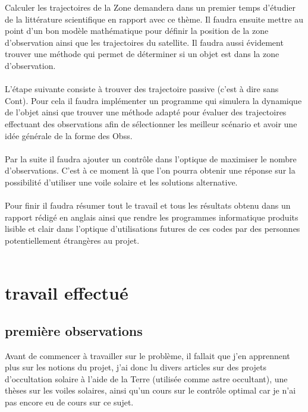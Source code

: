 \documentclass[12pt]{article} %
\begin{document}
		Calculer les trajectoires de la \gls{Zone} demandera dans un premier temps d'étudier de la littérature scientifique en rapport avec ce thème. Il faudra ensuite mettre au point d'un bon modèle mathématique pour définir la position de la zone d'observation ainsi que les trajectoires du satellite. Il faudra aussi évidement trouver une méthode qui permet de déterminer si un objet est dans la zone d'observation.
		\\ \\
		L'étape suivante consiste à trouver des trajectoire passive (c'est à dire sans \gls{Cont}). Pour cela il faudra implémenter un programme qui simulera la dynamique de l'objet ainsi que trouver une méthode adapté pour évaluer des trajectoires effectuant des observations afin de sélectionner les meilleur scénario et avoir une idée générale de la forme des \glspl{Obs}.
		\\ \\
		Par la suite il faudra ajouter un contrôle dans l'optique de maximiser le nombre d'observations. C'est à ce moment là que l'on pourra obtenir une réponse sur la possibilité d'utiliser une voile solaire et les solutions alternative.
		\\ \\
		Pour finir il faudra résumer tout le travail et tous les résultats obtenu dans un rapport rédigé en anglais ainsi que rendre les programmes informatique produits lisible et clair dans l'optique d'utilisations futures de ces codes par des personnes potentiellement étrangères au projet.
		\\ \\
		
		\newpage
		\section{travail effectué}
		
		\subsection{première observations}
		Avant de commencer à travailler sur le problème, il fallait que j'en apprennent plus sur les notions du projet, j'ai donc lu divers articles sur des projets d'occultation solaire à l'aide de la Terre (utilisée comme astre occultant), une thèses sur les voiles solaires, ainsi qu'un cours sur le contrôle optimal car je n'ai pas encore eu de cours sur ce sujet.
		
\end{document}

